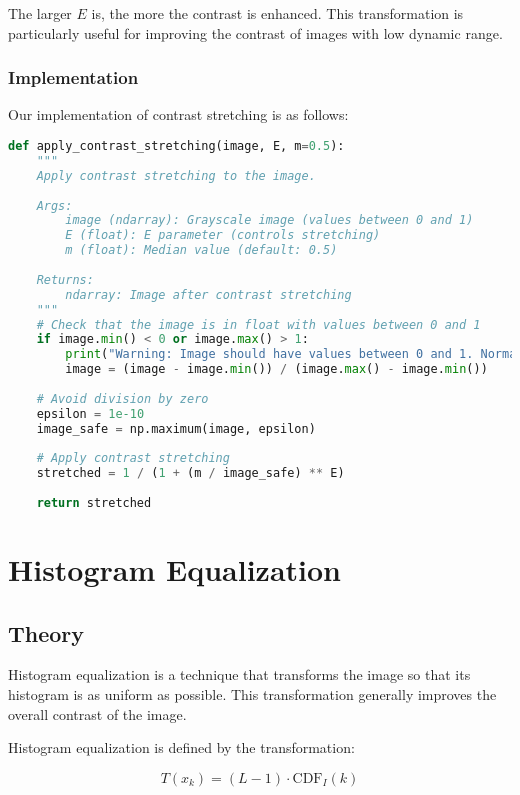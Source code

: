 \documentclass[12pt,a4paper]{article}
\begin{document}
The larger $E$ is, the more the contrast is enhanced. This transformation is particularly useful for improving the contrast of images with low dynamic range.

\subsubsection{Implementation}

Our implementation of contrast stretching is as follows:

\begin{lstlisting}[language=Python, caption=Contrast stretching implementation]
def apply_contrast_stretching(image, E, m=0.5):
    """
    Apply contrast stretching to the image.
    
    Args:
        image (ndarray): Grayscale image (values between 0 and 1)
        E (float): E parameter (controls stretching)
        m (float): Median value (default: 0.5)
        
    Returns:
        ndarray: Image after contrast stretching
    """
    # Check that the image is in float with values between 0 and 1
    if image.min() < 0 or image.max() > 1:
        print("Warning: Image should have values between 0 and 1. Normalization applied.")
        image = (image - image.min()) / (image.max() - image.min())
    
    # Avoid division by zero
    epsilon = 1e-10
    image_safe = np.maximum(image, epsilon)
    
    # Apply contrast stretching
    stretched = 1 / (1 + (m / image_safe) ** E)
    
    return stretched
\end{lstlisting}

\section{Histogram Equalization}

\subsection{Theory}

Histogram equalization is a technique that transforms the image so that its histogram is as uniform as possible. This transformation generally improves the overall contrast of the image.

Histogram equalization is defined by the transformation:

\begin{equation}
    T(x_k) = (L-1) \cdot \text{CDF}_I(k)
\end{equation}
\end{document}
